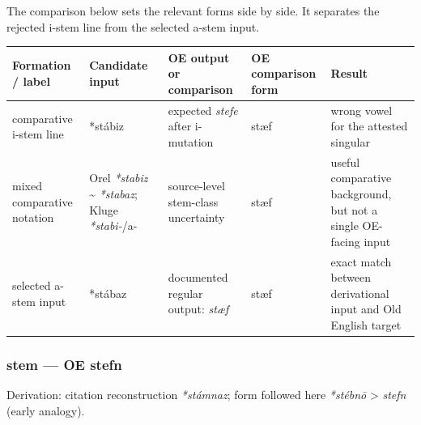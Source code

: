 \documentclass[
  british,
  a4paper,
]{article}
\newcounter{none} %
\begin{document}
The comparison below sets the relevant forms side by side. It separates
the rejected i-stem line from the selected a-stem input.

{\def\LTcaptype{none} %
\begin{longtable}[]{@{}
  >{\raggedright\arraybackslash}p{}
  >{\raggedright\arraybackslash}p{}
  >{\raggedright\arraybackslash}p{}
  >{\raggedright\arraybackslash}p{}
  >{\raggedright\arraybackslash}p{}@{}}
\toprule\noalign{}
\begin{minipage}[b]{\linewidth}\raggedright
Formation / label
\end{minipage} & \begin{minipage}[b]{\linewidth}\raggedright
Candidate input
\end{minipage} & \begin{minipage}[b]{\linewidth}\raggedright
OE output or comparison
\end{minipage} & \begin{minipage}[b]{\linewidth}\raggedright
OE comparison form
\end{minipage} & \begin{minipage}[b]{\linewidth}\raggedright
Result
\end{minipage} \\
\midrule\noalign{}
\endhead
\bottomrule\noalign{}
\endlastfoot
comparative i-stem line & *stábiz & expected \emph{stefe} after
i-mutation & stæf & wrong vowel for the attested singular \\
mixed comparative notation & Orel \emph{*stabiz} \textasciitilde{}
\emph{*stabaz}; Kluge \emph{*stabi-}/a- & source-level stem-class
uncertainty & stæf & useful comparative background, but not a single
OE-facing input \\
selected a-stem input & *stábaz & documented regular output: \emph{stæf}
& stæf & exact match between derivational input and Old English
target \\
\end{longtable}
}

\subsubsection{stem --- OE stefn}\label{stem-oe-stefn}

Derivation: citation reconstruction \emph{*stámnaz}; form followed here
\emph{*stébnō} \textgreater{} \emph{stefn} (early analogy).
\end{document}
